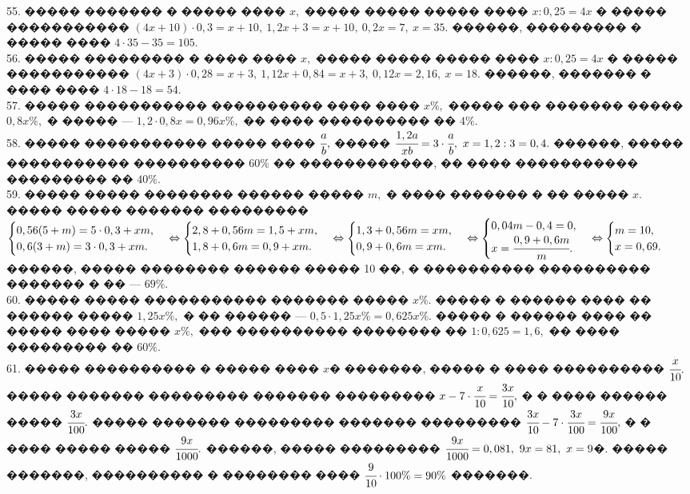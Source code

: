 \documentclass[12pt]{article}
\begin{document}
55. ����� ������� � ����� ���� $x,$ ����� ����� ����� ���� $x:0,25=4x$ � ����� ����������� $(4x+10)\cdot0,3=x+10,\ 1,2x+3=x+10,\ 0,2x=7,\ x=35.$ ������, ��������� � ����� ���� $4\cdot35-35=105.$\\
56. ����� ��������� � ���� ���� $x,$ ����� ����� ����� ���� $x:0,25=4x$ � ����� ����������� $(4x+3)\cdot0,28=x+3,\ 1,12x+0,84=x+3,\ 0,12x=2,16,\ x=18.$ ������, ������� � ���� ���� $4\cdot18-18=54.$\\
57. ����� ����������� ���������� ���� ���� $x\%,$ ����� ��� ������� ����� $0,8x\%,$ � ����� --- $1,2\cdot0,8x=0,96x\%,$ �� ���� ���������� �� $4\%.$\\
58. ����� ����������� ����� ���� $\cfrac{a}{b},$ ����� $\cfrac{1,2a}{xb}=3\cdot \cfrac{a}{b},\ x=1,2:3=0,4.$ ������, ����� ����������� ���������� $60\%$ �� ������������, �� ���� ����������� ��������� �� $40\%.$\\
59. ����� ����� �������� ������ ����� $m,$ � ���� ������� � �� ����� $x.$ ����� ����� ������� ��������� $\begin{cases}0,56(5+m)=5\cdot0,3+xm,\\0,6(3+m)=3\cdot0,3+xm.\end{cases}\Leftrightarrow
\begin{cases}2,8+0,56m=1,5+xm,\\ 1,8+0,6m=0,9+xm.\end{cases}\Leftrightarrow
\begin{cases}1,3+0,56m=xm,\\ 0,9+0,6m=xm.\end{cases}\Leftrightarrow
\begin{cases}0,04m-0,4=0,\\ x=\cfrac{0,9+0,6m}{m}.\end{cases}\Leftrightarrow
\begin{cases}m=10,\\ x=0,69.\end{cases}$ ������, ����� �������� ������ ����� 10 ��, � ���������� ���������� ������� � �� --- $69\%.$\\
60. ����� ����� ����������� ������� ����� $x\%.$ ����� � ������ ���� �� ������ ����� $1,25x\%,$ � �� ������ --- $0,5\cdot1,25x\%=0,625x\%.$ ����� � ������ ���� �� ����� ���� ����� $x\%,$ ��� ���������� �������� �� $1:0,625=1,6,$ �� ���� ��������� �� $60\%.$\\
61. ����� ���������� � ����� ���� $x$� �������, ����� � ���� ���������� $\cfrac{x}{10}.$ ����� ������� ��������� ������� ��������� $x-7\cdot\cfrac{x}{10}=\cfrac{3x}{10},$ � � ���� ������ ����� $\cfrac{3x}{100}.$ ����� ������� ��������� ������� ��������� $\cfrac{3x}{10}-7\cdot\cfrac{3x}{100}=\cfrac{9x}{100},$ � � ���� ����� ����� $\cfrac{9x}{1000}.$ ������, ����� ��������� $\cfrac{9x}{1000}=0,081,\ 9x=81,\ x=9$�. ����� �������, ���������� � �������� ���� $\cfrac{9}{10}\cdot100\%=90\%$ �������.\\
\end{document}
